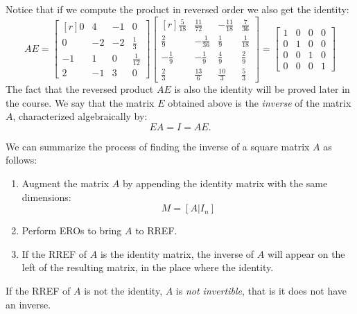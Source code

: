 \documentclass[12pt]{article}
\begin{document}
Notice that if we compute the product in reversed order we also get the identity:
\[
AE=
\left[\begin{matrix*}[r]0 & 4 & -1 & 0\\0 & -2 & -2 & \frac{1}{3}\\-1 & 1 & 0 & \frac{1}{12}\\2 & -1 & 3 & 0\end{matrix*}\right]
\left[\begin{matrix*}[r]\frac{5}{18} & \frac{11}{72} & - \frac{11}{18} & \frac{7}{36}\\\frac{2}{9} & - \frac{1}{36} & \frac{1}{9} & \frac{1}{18}\\- \frac{1}{9} & - \frac{1}{9} & \frac{4}{9} & \frac{2}{9}\\\frac{2}{3} & \frac{13}{6} & \frac{10}{3} & \frac{5}{3}\end{matrix*}\right]
=\begin{bmatrix}1&0&0&0\\0&1&0&0\\0&0&1&0\\0&0&0&1\end{bmatrix}
\]
The fact that the reversed product $AE$ is also the identity will be proved later in the course.
We say that the matrix $E$ obtained above is the \emph{inverse} of the matrix $A$, characterized algebraically by:
\[
EA=I=AE.
\] 

We can summarize the process of finding the inverse of a square matrix $A$ as follows:
\begin{enumerate}
\item Augment the matrix $A$ by appending the identity matrix with the same dimensions:
\[
M = \left[A|I_n\right]
\]
\item Perform EROs to bring $A$ to RREF.
\item If the RREF of $A$ is the identity matrix, the inverse of $A$ will appear on the left of the resulting matrix, in the place where the identity.
\end{enumerate}
If the RREF of $A$ is not the identity, $A$ is \emph{not invertible}, that is it does not have an inverse.
\end{document}
